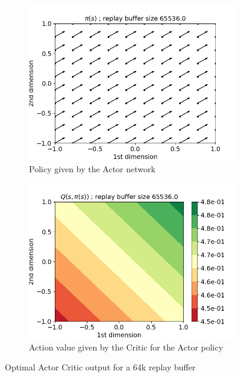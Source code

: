 \documentclass{article}
\begin{document}
\begin{figure}[H]
  \centering
   \begin{subfigure}[b]{0.45\linewidth}
    \includegraphics[width=\linewidth]{Study_1/policy/Pi_arrow_65536.png}
      \caption{Policy given by the Actor network}
  \end{subfigure}
  \begin{subfigure}[b]{0.45\linewidth}
    \includegraphics[width=\linewidth]{Study_1/policy/Q_contour_65536.png}
    \caption{Action value given by the Critic for the Actor policy}
  \end{subfigure}
  \caption{Optimal Actor Critic output for a 64k replay buffer}
  \label{fig:64k_policy}
\end{figure}
\end{document}
